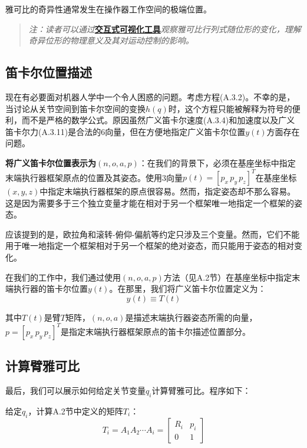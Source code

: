 \documentclass[UTF8,a4paper]{ctexart}
\begin{document}
雅可比的奇异性通常发生在操作器工作空间的极端位置。

\begin{quote}
\textit{注：读者可以通过}\href{https://frankjie09.github.io/Robot-Manipulator-Control-CN/figures/Jacobian_Singularities.html}{\textbf{交互式可视化工具}}\textit{观察雅可比行列式随位形的变化，理解奇异位形的物理意义及其对运动控制的影响。}
\end{quote}

\subsection{笛卡尔位置描述}

现在有必要面对机器人学中一个令人困惑的问题。考虑方程(A.3.2)。不幸的是，当讨论从关节空间到笛卡尔空间的变换$h(q)$时，这个方程只能被解释为符号的便利，而不是严格的数学公式。原因虽然广义笛卡尔速度(A.3.4)和加速度以及广义笛卡尔力(A.3.11)是合法的6向量，但在方便地指定广义笛卡尔位置$y(t)$方面存在问题。

\textbf{将广义笛卡尔位置表示为$(n, o, a, p)$}：在我们的背景下，必须在基座坐标中指定末端执行器框架原点的位置及其姿态。使用3向量$p(t) = [p_x \, p_y \, p_z]^T$在基座坐标$(x, y, z)$中指定末端执行器框架的原点很容易。然而，指定姿态却不那么容易。这是因为需要多于三个独立变量才能在相对于另一个框架唯一地指定一个框架的姿态。

应该提到的是，欧拉角和滚转-俯仰-偏航等约定只涉及三个变量。然而，它们不能用于唯一地指定一个框架相对于另一个框架的绝对姿态，而只能用于姿态的相对变化。

在我们的工作中，我们通过使用$(n, o, a, p)$方法（见A.2节）在基座坐标中指定末端执行器的笛卡尔位置$y(t)$。在那里，我们将广义笛卡尔位置定义为：
\begin{equation}
y(t) \equiv T(t)
\tag{A.3.13}
\end{equation}

其中$T(t)$是臂$T$矩阵，$(n, o, a)$是描述末端执行器姿态所需的向量，$p = [p_x \, p_y \, p_z]^T$是指定末端执行器框架原点的笛卡尔描述位置部分。

\subsection{计算臂雅可比}

最后，我们可以展示如何给定关节变量$q_i$计算臂雅可比。程序如下：

给定$q_i$，计算A.2节中定义的矩阵$T_i$：
\begin{equation}
T_i = A_1 A_2 \cdots A_i = \begin{bmatrix} R_i & p_i \\ 0 & 1 \end{bmatrix}
\tag{A.3.29}
\end{equation}
\end{document}
